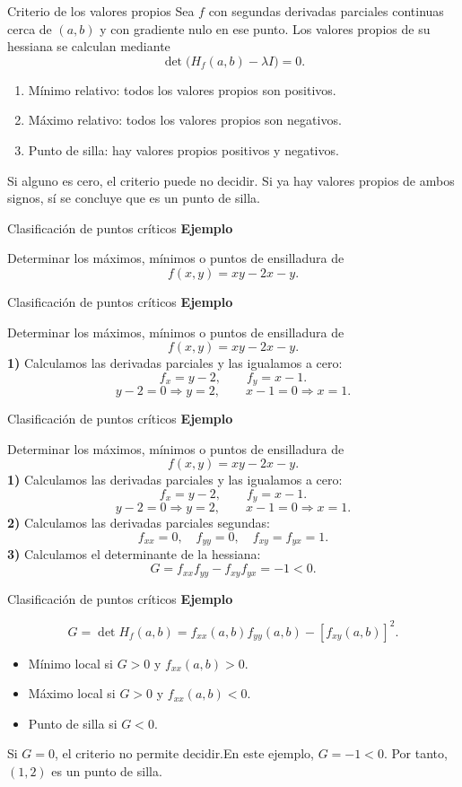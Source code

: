 \documentclass[main.tex]{subfiles}
\begin{document}
\begin{frame}{Criterio de los valores propios}
\small Sea $f$ con segundas derivadas parciales continuas cerca de $(a,b)$ y con gradiente nulo en ese punto. Los valores propios de su hessiana se calculan mediante
\[\det\bigl(H_f(a,b)-\lambda I\bigr)=0.\]
\begin{enumerate}
\item Mínimo relativo: todos los valores propios son positivos.
\item Máximo relativo: todos los valores propios son negativos.
\item Punto de silla: hay valores propios positivos y negativos.
\end{enumerate}
Si alguno es cero, el criterio puede no decidir. Si ya hay valores propios de ambos signos, sí se concluye que es un punto de silla.
\end{frame}
\begin{frame}{Clasificación de puntos críticos}
\textbf{Ejemplo}\par Determinar los máximos, mínimos o puntos de ensilladura de\[f(x,y)=xy-2x-y.\]
\end{frame}
\begin{frame}{Clasificación de puntos críticos}
\textbf{Ejemplo}\par Determinar los máximos, mínimos o puntos de ensilladura de\[f(x,y)=xy-2x-y.\]\textbf{1)} Calculamos las derivadas parciales y las igualamos a cero:
\[f_x=y-2,\qquad f_y=x-1.\]
\[y-2=0\Rightarrow y=2,\qquad x-1=0\Rightarrow x=1.\]
\end{frame}
\begin{frame}{Clasificación de puntos críticos}
\small\textbf{Ejemplo}\par Determinar los máximos, mínimos o puntos de ensilladura de\[f(x,y)=xy-2x-y.\]\textbf{1)} Calculamos las derivadas parciales y las igualamos a cero:
\[f_x=y-2,\qquad f_y=x-1.\]
\[y-2=0\Rightarrow y=2,\qquad x-1=0\Rightarrow x=1.\]\textbf{2)} Calculamos las derivadas parciales segundas:
\[f_{xx}=0,\quad f_{yy}=0,\quad f_{xy}=f_{yx}=1.\]
\textbf{3)} Calculamos el determinante de la hessiana:
\[G=f_{xx}f_{yy}-f_{xy}f_{yx}=-1<0.\]
\end{frame}
\begin{frame}{Clasificación de puntos críticos}
\small\textbf{Ejemplo}\par\[G=\det H_f(a,b)=f_{xx}(a,b)f_{yy}(a,b)-[f_{xy}(a,b)]^2.\]
\begin{itemize}
\item Mínimo local si $G>0$ y $f_{xx}(a,b)>0$.
\item Máximo local si $G>0$ y $f_{xx}(a,b)<0$.
\item Punto de silla si $G<0$.
\end{itemize}
Si $G=0$, el criterio no permite decidir.\medskip En este ejemplo, $G=-1<0$. Por tanto, $(1,2)$ es un punto de silla.
\end{frame}
\end{document}
